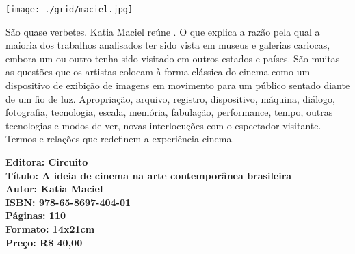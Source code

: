 \pagestyle{circuito}
\label{circuito}




\begin{center}
\hspace*{.5cm}\texttt{[image: ./grid/maciel.jpg]}
\end{center}

\hspace*{-7cm}\hrulefill\hspace*{-7cm}

\medskip

\noindent{}São quase verbetes. Katia Maciel reúne . O que explica a
razão pela qual a maioria dos trabalhos analisados ter sido vista em museus
e galerias cariocas, embora um ou outro tenha sido visitado em outros
estados e países. São muitas as questões que os artistas colocam à forma
clássica do cinema como um dispositivo de exibição de imagens em
movimento para um público sentado diante de um fio de luz. Apropriação,
arquivo, registro, dispositivo, máquina, diálogo, fotografia, tecnologia, escala,
memória, fabulação, performance, tempo, outras tecnologias e modos de ver,
novas interlocuções com o espectador visitante. Termos e relações que
redefinem a experiência cinema.

\vfill

\hspace*{-.4cm}\begin{minipage}[c]{1\linewidth}
\small\textbf{
\hspace*{-.1cm}Editora: Circuito\\
Título: A ideia de cinema na arte contemporânea brasileira\\
Autor: Katia Maciel\\ 
ISBN: 978-65-8697-404-01\\
Páginas: 110\\
Formato: 14x21cm\\
Preço: R\$ 40,00\\
}
\end{minipage}

